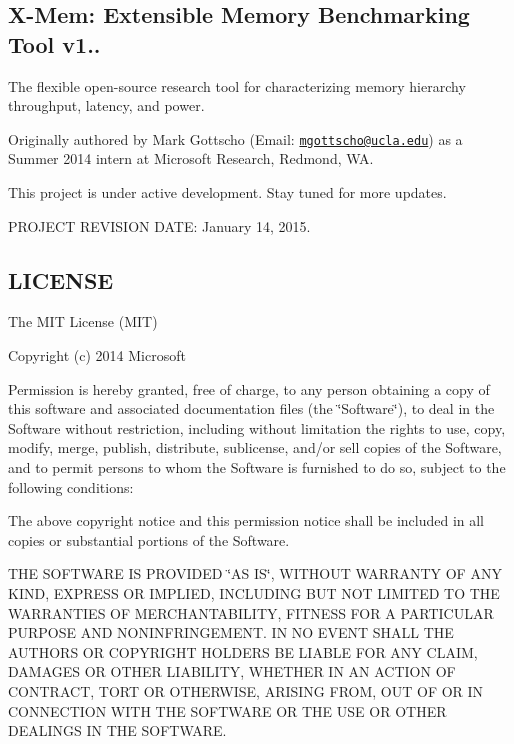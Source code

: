 \subsection*{X-\/\+Mem\+: Extensible Memory Benchmarking Tool v1.. }

The flexible open-\/source research tool for characterizing memory hierarchy throughput, latency, and power.

Originally authored by Mark Gottscho (Email\+: \href{mailto:mgottscho@ucla.edu}{\tt mgottscho@ucla.\+edu}) as a Summer 2014 intern at Microsoft Research, Redmond, W\+A.

This project is under active development. Stay tuned for more updates.

P\+R\+O\+J\+E\+C\+T R\+E\+V\+I\+S\+I\+O\+N D\+A\+T\+E\+: January 14, 2015. 

 \subsection*{L\+I\+C\+E\+N\+S\+E }

The M\+I\+T License (M\+I\+T)

Copyright (c) 2014 Microsoft

Permission is hereby granted, free of charge, to any person obtaining a copy of this software and associated documentation files (the \char`\"{}\+Software\char`\"{}), to deal in the Software without restriction, including without limitation the rights to use, copy, modify, merge, publish, distribute, sublicense, and/or sell copies of the Software, and to permit persons to whom the Software is furnished to do so, subject to the following conditions\+:

The above copyright notice and this permission notice shall be included in all copies or substantial portions of the Software.

T\+H\+E S\+O\+F\+T\+W\+A\+R\+E I\+S P\+R\+O\+V\+I\+D\+E\+D \char`\"{}\+A\+S I\+S\char`\"{}, W\+I\+T\+H\+O\+U\+T W\+A\+R\+R\+A\+N\+T\+Y O\+F A\+N\+Y K\+I\+N\+D, E\+X\+P\+R\+E\+S\+S O\+R I\+M\+P\+L\+I\+E\+D, I\+N\+C\+L\+U\+D\+I\+N\+G B\+U\+T N\+O\+T L\+I\+M\+I\+T\+E\+D T\+O T\+H\+E W\+A\+R\+R\+A\+N\+T\+I\+E\+S O\+F M\+E\+R\+C\+H\+A\+N\+T\+A\+B\+I\+L\+I\+T\+Y, F\+I\+T\+N\+E\+S\+S F\+O\+R A P\+A\+R\+T\+I\+C\+U\+L\+A\+R P\+U\+R\+P\+O\+S\+E A\+N\+D N\+O\+N\+I\+N\+F\+R\+I\+N\+G\+E\+M\+E\+N\+T. I\+N N\+O E\+V\+E\+N\+T S\+H\+A\+L\+L T\+H\+E A\+U\+T\+H\+O\+R\+S O\+R C\+O\+P\+Y\+R\+I\+G\+H\+T H\+O\+L\+D\+E\+R\+S B\+E L\+I\+A\+B\+L\+E F\+O\+R A\+N\+Y C\+L\+A\+I\+M, D\+A\+M\+A\+G\+E\+S O\+R O\+T\+H\+E\+R L\+I\+A\+B\+I\+L\+I\+T\+Y, W\+H\+E\+T\+H\+E\+R I\+N A\+N A\+C\+T\+I\+O\+N O\+F C\+O\+N\+T\+R\+A\+C\+T, T\+O\+R\+T O\+R O\+T\+H\+E\+R\+W\+I\+S\+E, A\+R\+I\+S\+I\+N\+G F\+R\+O\+M, O\+U\+T O\+F O\+R I\+N C\+O\+N\+N\+E\+C\+T\+I\+O\+N W\+I\+T\+H T\+H\+E S\+O\+F\+T\+W\+A\+R\+E O\+R T\+H\+E U\+S\+E O\+R O\+T\+H\+E\+R D\+E\+A\+L\+I\+N\+G\+S I\+N T\+H\+E S\+O\+F\+T\+W\+A\+R\+E. 

